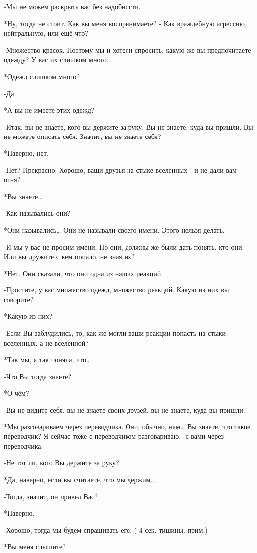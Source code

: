 -Мы не можем раскрыть вас без надобности.

*Ну, тогда не стоит. Как вы меня воспринимаете? - Как враждебную агрессию, нейтральную, или ещё что?

-Множество красок. Поэтому мы и хотели спросить, какую же вы предпочитаете одежду? У вас их слишком много.

*Одежд слишком много?

-Да.

*А вы не имеете этих одежд?

-Итак, вы не знаете, кого вы держите за руку. Вы не знаете, куда вы пришли. Вы не можете описать себя. Значит, вы не знаете себя?

*Наверно, нет.

-Нет? Прекрасно. Хорошо, ваши друзья на стыке вселенных - и не дали вам огня?

*Вы знаете…

-Как назывались они?

*Они назывались… Они не называли своего имени. Этого нельзя делать.

-И мы у вас не просим имени. Но они, должны же были дать понять, кто они. Или вы дружите с кем попало, не зная их?

*Нет. Они сказали, что они одна из наших реакций. 

-Простите, у вас множество одежд, множество реакций. Какую из них вы говорите?

*Какую из них?

-Если Вы заблудились, то, как же могли ваши реакции попасть на стыки вселенных, а не вселенной?

*Так мы, я так поняла, что…

-Что Вы тогда знаете?

*О чём?

-Вы не видите себя, вы не знаете своих друзей, вы не знаете, куда вы пришли.

*Мы разговариваем через переводчика. Они, обычно, нам… Вы знаете, что такое переводчик? Я сейчас тоже с переводчиком разговариваю,-  с вами через переводчика.

-Не тот ли, кого Вы держите за руку?

*Да, наверно, если вы считаете, что мы держим…

-Тогда, значит, он привел Вас?

*Наверно.

-Хорошо, тогда мы будем спрашивать его. ( 4 сек. тишины. прим.)

*Вы меня слышите?

